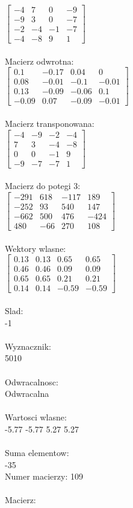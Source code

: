 \documentclass[a4paper,12pt]{article}
\begin{document}
$\begin{bmatrix} -4&7&0&-9\\-9&3&0&-7\\-2&-4&-1&-7\\-4&-8&9&1 \end{bmatrix}$
\\
\\
Macierz odwrotna:\\

$\begin{bmatrix} 0.1&-0.17&0.04&0\\0.08&-0.01&-0.1&-0.01\\0.13&-0.09&-0.06&0.1\\-0.09&0.07&-0.09&-0.01 \end{bmatrix}$
\\
\\
Macierz transponowana:\\

$\begin{bmatrix} -4&-9&-2&-4\\7&3&-4&-8\\0&0&-1&9\\-9&-7&-7&1 \end{bmatrix}$
\\
\\
Macierz do potegi 3:\\

$\begin{bmatrix} -291&618&-117&189\\-252&93&540&147\\-662&500&476&-424\\480&-66&270&108 \end{bmatrix}$
\\
\\
Wektory wlasne:\\

$\begin{bmatrix} 0.13&0.13&0.65&0.65\\0.46&0.46&0.09&0.09\\0.65&0.65&0.21&0.21\\0.14&0.14&-0.59&-0.59 \end{bmatrix}$
\\
\\
Slad:\\
-1
\\
\\
Wyznacznik:\\
5010
\\
\\
Odwracalnosc:\\
Odwracalna
\\
\\
Wartosci wlasne:\\
-5.77 -5.77 5.27 5.27
\\
\\
Suma elementow:\\
-35
\\
\newpage
Numer macierzy:
109
\\
\\
Macierz:\\
\end{document}
